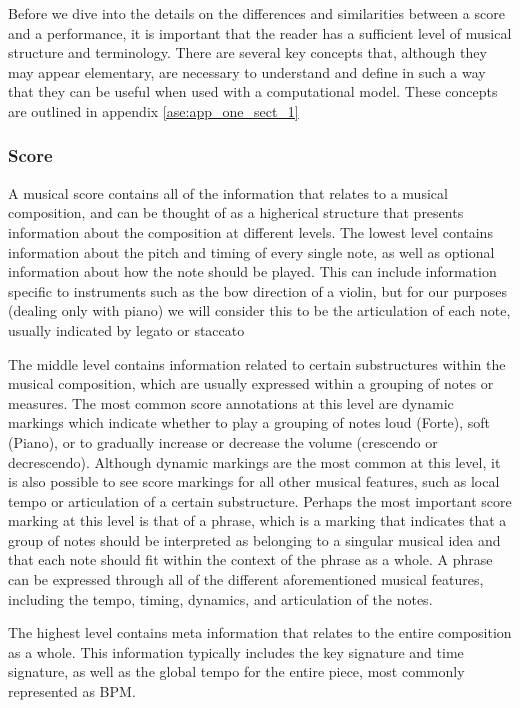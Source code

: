 Before we dive into the details on the differences and similarities between a score and a performance, it is important that the reader has a sufficient level of musical structure and terminology. There are several key concepts that, although they may appear elementary, are necessary to understand and define in such a way that they can be useful when used with a computational model. These concepts are outlined in appendix \ref{ase:app_one_sect_1}

\subsubsection{Score}

A musical score contains all of the information that relates to a musical composition, and can be thought of as a higherical structure that presents information about the composition at different levels. The lowest level contains information about the pitch and timing of every single note, as well as optional information about how the note should be played. This can include information specific to instruments such as the bow direction of a violin, but for our purposes (dealing only with piano) we will consider this to be the articulation of each note, usually indicated by legato or staccato 

The middle level contains information related to certain substructures within the musical composition, which are usually expressed within a grouping of notes or measures. The most common score annotations at this level are dynamic markings which indicate whether to play a grouping of notes loud (Forte), soft (Piano), or to gradually increase or decrease the volume (crescendo or decrescendo). %
Although dynamic markings are the most common at this level, it is also possible to see score markings for all other musical features, such as local tempo or articulation of a certain substructure. Perhaps the most important score marking at this level is that of a phrase, which is a marking that indicates that a group of notes should be interpreted as belonging to a singular musical idea and that each note should fit within the context of the phrase as a whole. A phrase can be expressed through all of the different aforementioned musical features, including the tempo, timing, dynamics, and articulation of the notes.

The highest level contains meta information that relates to the entire composition as a whole. This information typically includes the key signature and time signature, as well as the global tempo for the entire piece, most commonly represented as BPM. 

